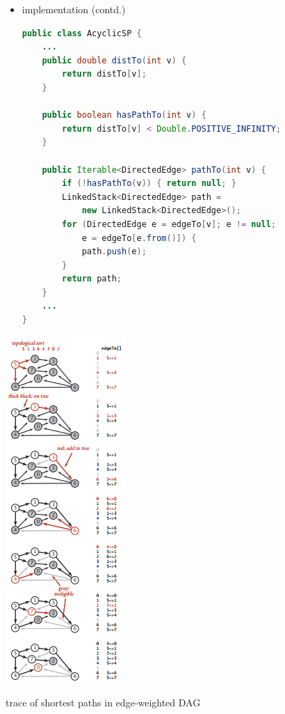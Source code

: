 \documentclass[8pt,a4paper,compress]{beamer}
\begin{document}
\begin{frame}[fragile]
\begin{minipage}{220pt}
\begin{itemize}
\item implementation (contd.)
\begin{lstlisting}[language=Java]
public class AcyclicSP {
    ...
    public double distTo(int v) { 
        return distTo[v]; 
    }

    public boolean hasPathTo(int v) { 
        return distTo[v] < Double.POSITIVE_INFINITY; 
    }
    
    public Iterable<DirectedEdge> pathTo(int v) {
        if (!hasPathTo(v)) { return null; }
        LinkedStack<DirectedEdge> path = 
            new LinkedStack<DirectedEdge>();
        for (DirectedEdge e = edgeTo[v]; e != null; 
            e = edgeTo[e.from()]) {
            path.push(e);
        }
        return path;
    }
    ...
}
\end{lstlisting}
\end{itemize}
\end{minipage}%
\begin{minipage}{80pt}
\begin{center}
\includegraphics[scale=0.42]{./figures/sp5.png}

\smallskip

\small trace of shortest paths in edge-weighted DAG
\end{center}
\end{minipage}
\end{frame}
\end{document}
